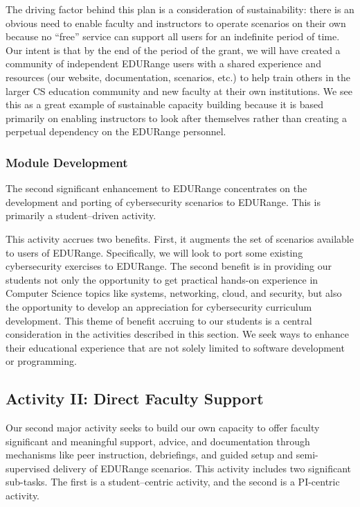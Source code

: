 The driving factor behind this plan is a consideration of
sustainability: there is an obvious need to enable faculty and
instructors to operate scenarios on their own because no ``free''
service can support all users for an indefinite period of time.  Our
intent is that by the end of the period of the grant, we will have
created a community of independent EDURange users with a shared
experience and resources (our website, documentation, scenarios, etc.)
to help train others in the larger CS education community and new
faculty at their own institutions.  We see this as a great example of
sustainable capacity building because it is based primarily on
enabling instructors to look after themselves rather than creating a
perpetual dependency on the EDURange personnel.

\subsubsection{Module Development}

The second significant enhancement to EDURange concentrates on the
development and porting of cybersecurity scenarios to EDURange.  This
is primarily a student--driven activity.  

This activity accrues two benefits.  First, it augments the set of
scenarios available to users of EDURange.  Specifically, we will look
to port some existing cybersecurity exercises to EDURange.  The second
benefit is in providing our students not only the opportunity to get
practical hands-on experience in Computer Science topics like systems,
networking, cloud, and security, but also the opportunity to develop
an appreciation for cybersecurity curriculum development.  This theme
of benefit accruing to our students is a central consideration in the
activities described in this section. We seek ways to enhance their
educational experience that are not solely limited to software
development or programming.

\subsection{Activity II: Direct Faculty Support}

Our second major activity seeks to build our own capacity to offer
faculty significant and meaningful support, advice, and documentation
through mechanisms like peer instruction, debriefings, and guided
setup and semi-supervised delivery of EDURange scenarios. This
activity includes two significant sub-tasks.  The first is a
student--centric activity, and the second is a PI-centric activity.

